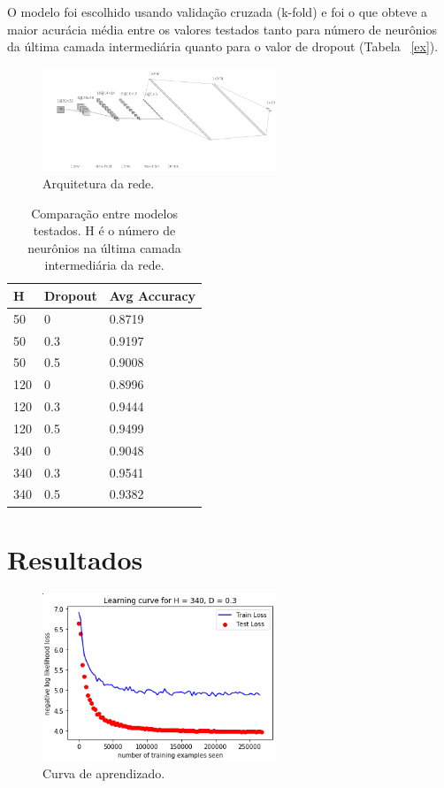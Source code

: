 \documentclass[11pt]{article}
\begin{document}
O modelo foi escolhido usando validação cruzada (k-fold) e foi o que obteve a maior acurácia média entre os valores testados tanto para número de neurônios da última camada intermediária quanto para o valor de dropout (Tabela ~\ref{ex}).

  \begin{figure}[H]
        {\centering
        \includegraphics[width=70mm]{images/nn.png}
        \caption{Arquitetura da rede.}
        \label{fig:nn}\par}
  \end{figure}

\begin{table}[H]
    {\centering
\begin{tabular}{@{}lll@{}}
\toprule
H   & Dropout & Avg Accuracy \\ \midrule
50  & 0       & 0.8719       \\
50  & 0.3     & 0.9197       \\
50  & 0.5     & 0.9008       \\
120 & 0       & 0.8996       \\
120 & 0.3     & 0.9444       \\
120 & 0.5     & 0.9499       \\
340 & 0       & 0.9048       \\
340 & 0.3     & 0.9541       \\
340 & 0.5     & 0.9382       \\ \bottomrule
\end{tabular}
\caption{Comparação entre modelos testados. H é o número de neurônios na última camada intermediária da rede.}
\label{tab:ex}
    \par}
\end{table}

\section{Resultados}

  \begin{figure}[H]
        {\centering
        \includegraphics[width=70mm]{images/learning.png}
        \caption{Curva de aprendizado.}
        \label{fig:learning}\par}
  \end{figure}
\end{document}
